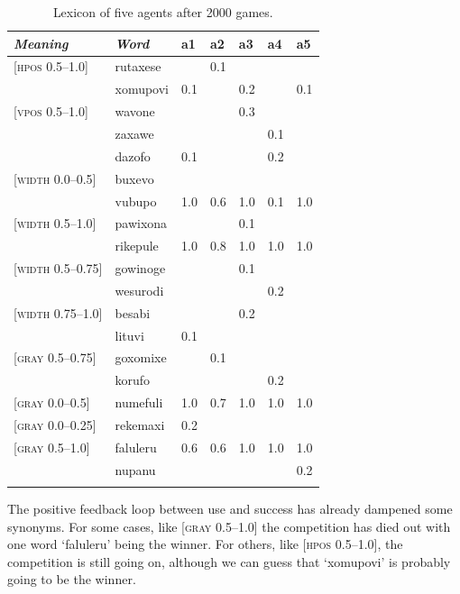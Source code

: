 \begin{table}[h]
\begin{center}
\begin{tabular}{ l  l  l  l  l  l  l  }
\lsptoprule
{\itshape Meaning}&{\itshape Word}&{\bfshape  a1}&{\bfshape  a2}&{\bfshape  a3}&{\bfshape  a4}&{\bfshape  a5} \\ \midrule
{}[\textsc{hpos} 0.5–1.0]&rutaxese& &0.1& & &\\ 
 & xomupovi&0.1& &0.2& &0.1\\ 
{}[\textsc{vpos} 0.5–1.0]&wavone& & &0.3& &\\ 
 & zaxawe& & & &0.1& \\ 
 & dazofo&0.1& & &0.2&\\ 
{}[\textsc{width} 0.0–0.5]&buxevo& & & & & \\ 
 & vubupo&1.0&0.6&1.0&0.1&1.0\\ 
{}[\textsc{width} 0.5–1.0]&pawixona& & &0.1& & \\ 
 & rikepule&1.0&0.8&1.0&1.0&1.0\\ 
{}[\textsc{width} 0.5–0.75]&gowinoge& & &0.1& &  \\ 
 & wesurodi& & & &0.2&\\ 
{}[\textsc{width} 0.75–1.0]&besabi& & &0.2& & \\ 
 & lituvi&0.1& & & & \\ 
{}[\textsc{gray} 0.5–0.75]&goxomixe& &0.1& & & \\ 
 & korufo& & & &0.2&\\ 
{}[\textsc{gray} 0.0–0.5]&numefuli&1.0&0.7&1.0&1.0&1.0\\ 
{}[\textsc{gray} 0.0–0.25]&rekemaxi&0.2& & & & \\ 
{}[\textsc{gray} 0.5–1.0]&faluleru&0.6&0.6&1.0&1.0&1.0\\ 
 & nupanu& & & & &0.2 \\ 
\lspbottomrule
\end{tabular}
\caption{\label{tab:lex2000}Lexicon of five agents after 2000 games.}
\end{center}
\end{table}

\clearpage 
The positive feedback loop between use and success
has already dampened some synonyms. For some cases, like [\textsc{gray} 0.5–1.0] the competition has died out 
with one word `faluleru' being the winner. 
For others, like [\textsc{hpos} 0.5–1.0], the competition 
is still going on, although we can guess
that `xomupovi' is probably going to be the winner. 

